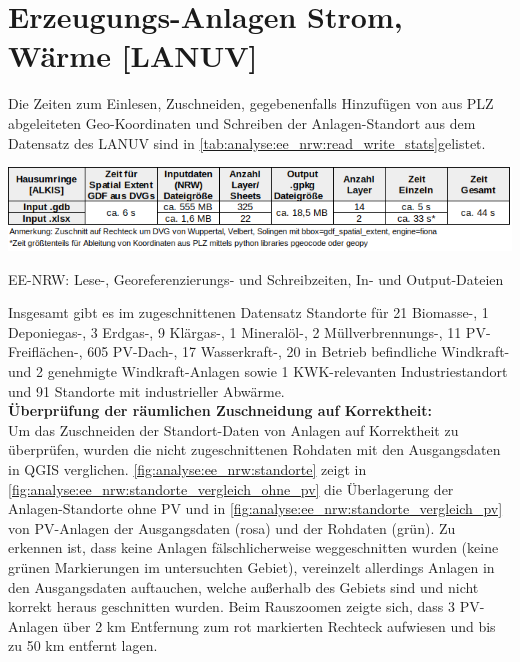 		
		
	\section{Erzeugungs-Anlagen Strom, Wärme [LANUV]}
		Die Zeiten zum Einlesen, Zuschneiden, gegebenenfalls Hinzufügen von aus PLZ abgeleiteten Geo-Koordinaten und Schreiben der Anlagen-Standort aus dem Datensatz des LANUV sind in \autoref{tab:analyse:ee_nrw:read_write_stats}gelistet. 
				
		\begin{table}[h]
			\includegraphics[width=\linewidth]{./Medien/tables/read_write_stats/ee_nrw_read_write_stats.png}
			\caption{EE-NRW: Lese-, Georeferenzierungs- und Schreibzeiten, In- und Output-Dateien}
			\label{tab:analyse:ee_nrw:read_write_stats}	
		\end{table}
		
		Insgesamt gibt es im zugeschnittenen Datensatz Standorte für 21 Biomasse-, 1 Deponiegas-, 3 Erdgas-, 9 Klärgas-, 1 Mineralöl-, 2 Müllverbrennungs-, 11 PV-Freiflächen-, 605 PV-Dach-, 17 Wasserkraft-, 20 in Betrieb befindliche Windkraft- und 2 genehmigte Windkraft-Anlagen sowie 1 KWK-relevanten Industriestandort und 91 Standorte mit industrieller Abwärme.\\
		
		\textbf{Überprüfung der räumlichen Zuschneidung auf Korrektheit:}\\
		Um das Zuschneiden der Standort-Daten von Anlagen auf Korrektheit zu überprüfen, wurden die nicht zugeschnittenen Rohdaten mit den Ausgangsdaten in QGIS verglichen. \autoref{fig:analyse:ee_nrw:standorte} zeigt in \autoref{fig:analyse:ee_nrw:standorte_vergleich_ohne_pv} die Überlagerung der Anlagen-Standorte ohne PV und in \autoref{fig:analyse:ee_nrw:standorte_vergleich_pv} von PV-Anlagen der Ausgangsdaten (rosa) und der Rohdaten (grün). Zu erkennen ist, dass keine Anlagen fälschlicherweise weggeschnitten wurden (keine grünen Markierungen im untersuchten Gebiet), vereinzelt allerdings Anlagen in den Ausgangsdaten auftauchen, welche außerhalb des Gebiets sind und nicht korrekt heraus geschnitten wurden. Beim Rauszoomen zeigte sich, dass 3 PV-Anlagen über 2 km Entfernung zum rot markierten Rechteck aufwiesen und bis zu 50 km entfernt lagen. 

